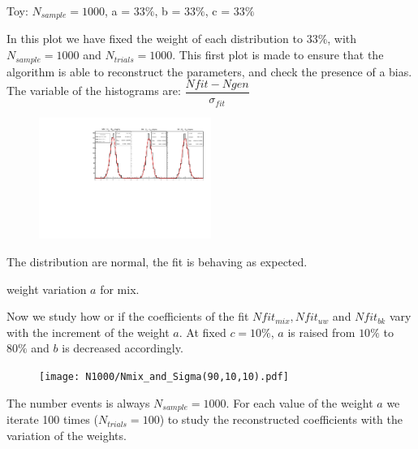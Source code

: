 \documentclass[9pt]{beamer}
\begin{document}
\begin{frame}[t]{Toy: $N_{sample} = 1000$, a = $ 33\%$, b = $33\%$, c = $33\%$}

In this plot we have fixed the weight of each distribution to $33\%$, with $N_{sample} = 1000$ and $N_{trials} = 1000$. This first plot is made to ensure that the algorithm is able to reconstruct the parameters, and check the presence of a bias.
The variable of the histograms are: $\dfrac{Nfit - Ngen}{\sigma_{fit}}$

\begin{figure}
\includegraphics[width = 0.5\textwidth]{N1000/ToyNmix(33,33,33).pdf} 
\end{figure}

The distribution are normal, the fit is behaving as expected.

\end{frame}

\begin{frame}{weight variation $a$ for mix.}

Now we study how or if the coefficients of the fit $Nfit_{mix}, Nfit_{uw}$ and $Nfit_{bk}$ vary with the increment of the weight $a$. 
At fixed $c = 10\%$, $a$ is raised from $10\%$ to $80\%$ and $b$ is decreased accordingly. 

\begin{figure}
\vspace{-7pt}
\texttt{[image: N1000/Nmix\_and\_Sigma(90,10,10).pdf]}
\end{figure}
The number events is always $ N_{sample} = 1000$. For each value of the weight $a$  we\\ iterate 100 times ($N_{trials} = 100$) to study the reconstructed coefficients with the \\ variation of the weights.
\end{frame}
\end{document}
